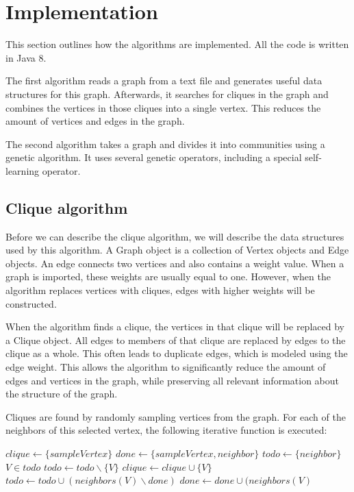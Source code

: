 \section{Implementation}
\label{chapter:implementation}
This section outlines how the algorithms are implemented. All the code is written in Java 8.
\par
 The first algorithm reads a graph from a text file and generates useful data structures for this graph. Afterwards, it searches for cliques in the graph and combines the vertices in those cliques into a single vertex. This reduces the amount of vertices and edges in the graph.
\par
The second algorithm takes a graph and divides it into communities using a genetic algorithm. It uses several genetic operators, including a special self-learning operator.
\subsection{Clique algorithm}
Before we can describe the clique algorithm, we will describe the data structures used by this algorithm. A Graph object is a collection of Vertex objects and Edge objects. An edge connects two vertices and also contains a weight value. When a graph is imported, these weights are usually equal to one. However, when the algorithm replaces vertices with cliques, edges with higher weights will be constructed. 
\par
When the algorithm finds a clique, the vertices in that clique will be replaced by a Clique object. All edges to members of that clique are replaced by edges to the clique as a whole. This often leads to duplicate edges, which is modeled using the edge weight. This allows the algorithm to significantly reduce the amount of edges and vertices in the graph, while preserving all relevant information about the structure of the graph.
\par
Cliques are found by randomly sampling vertices from the graph. For each of the neighbors of this selected vertex, the following iterative function is executed:
\\
\begin{algorithmic}
\STATE $clique \leftarrow \{sampleVertex\}$
\STATE $done \leftarrow \{sampleVertex, neighbor\}$
\STATE $todo \leftarrow \{neighbor\}$
\STATE $V \in todo$
\STATE $todo \leftarrow todo \backslash \{V\}$
\STATE $clique \leftarrow clique \cup \{V\}$
\STATE $todo \leftarrow todo \cup (neighbors(V) \backslash done )$
\STATE $done \leftarrow done \cup(neighbors(V)$
\ENDIF
\ENDWHILE
{}
\ELSE
\RETURN{$\{\}$}
\ENDIF
\end{algorithmic}


